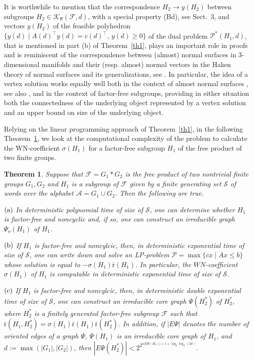 \documentclass[10pt, reqno]{amsart}
\numberwithin{equation}{section}
\newtheorem{thm}{Theorem}[section]
\begin{document}
It is worthwhile to mention that  the correspondence $H_2 \to  y(H_2)$ between subgroups $H_2 \in { \mathcal{K}_{\textsf{ff}}(\mathcal{F}, d)}$, with a special property (Bd), see Sect.~3, and vectors $y(H_2)$ of the feasible polyhedron  $\{ y(d)  \mid A(d)^{\top}y(d) = c(d)^{\top} , \, y(d) \ge 0  \}$  of the dual problem ${\mathcal{P}}^*(H_1, d)$, that  is mentioned in part (b) of Theorem~\ref{th1},  plays an important role in proofs and is reminiscent of the correspondence between (almost) normal surfaces in 3-dimensional manifolds and their (resp. almost)  normal vectors in the Haken theory of normal surfaces and its generalizations, see \cite{Haken, HLP, Hemion, Iv08s, JT}. In particular, the idea of a vertex solution works equally well both in the context of almost normal surfaces \cite{Iv08s}, see also \cite{HLP, JT}, and in the context of factor-free subgroups, providing in either  situation  both the connectedness of the underlying object represented by a vertex solution and an upper bound on size of the underlying object.
\medskip

Relying on the linear programming approach of Theorem~\ref{th1}, in the following Theorem~\ref{th2}, we look at the computational complexity  of the problem to calculate the WN-coefficient $\sigma(H_1)$ for a factor-free subgroup $H_1$  of the free product of two finite groups.

\begin{thm}\label{th2}  Suppose that ${\mathcal{F}} =G_1 * G_2$ is the free product of two nontrivial finite groups $G_1,  G_2$ and $H_1$ is a subgroup of ${\mathcal{F}}$ given by a finite generating set ${\mathcal{S}}$ of words over the alphabet
${\mathcal{A}} = G_1 \cup G_2$. Then the following are true.

$\rm{(a)}$ In deterministic polynomial time of size of ${\mathcal{S}}$, one can
determine whether $H_1$ is factor-free and noncyclic and, if so, one can construct an  irreducible graph $\Psi_o(H_1)$  of $H_1$.

$\rm{(b)}$  If  $H_1$ is factor-free and noncylcic, then, in deterministic exponential time of size of ${\mathcal{S}}$, one can write down and solve an LP-problem ${\mathcal{P}} = \max\{ cx \mid Ax \le b  \}$ whose solution is equal to $-\sigma(H_1) {\bar {\mathrm{r}}} (H_1)$. In particular, the $WN$-coefficient $\sigma(H_1)$ of $H_1$ is computable in deterministic exponential time of size of ${\mathcal{S}}$.

$\rm{(c)}$  If  $H_1$ is factor-free and noncylcic, then, in deterministic double exponential time of size of ${\mathcal{S}}$, one can construct an irreducible core graph $\Psi(H_2^*)$ of $H_2^*$, where $H_2^*$ is a finitely generated factor-free subgroup ${\mathcal{F}}$ such that
$\bar {\mathrm{r}}(H_1, H_2^*) =  \sigma(H_1)  \bar {\mathrm{r}}(H_1) \bar {\mathrm{r}}( H_2^*)$.
In addition, if $| E\Psi |$ denotes the number of oriented edges of a graph $\Psi$, $\Psi(H_1)$ is an irreducible core graph of $H_1$, and   $d := \max( |G_1|, |G_2|)$, then
$
| E \Psi(H_2^*) |  <  2^{ 2^{4| E \Psi(H_1) | +1+ \log_2 \log_2 (2d)  } } .
$
\end{thm}
\end{document}
